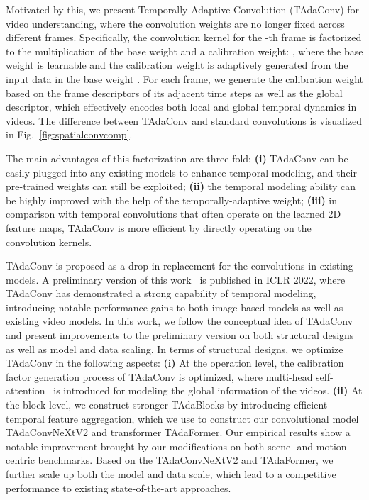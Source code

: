 \documentclass[10pt,journal,compsoc]{IEEEtran}
\begin{document}
Motivated by this, 
we present Temporally-Adaptive Convolution (TAdaConv) for video understanding, where the convolution weights are no longer fixed across different frames. 
Specifically, the convolution kernel for the -th frame  is factorized to the multiplication of the base weight and a calibration weight: , where the base weight  is learnable and the calibration weight  is adaptively generated from the input data in the base weight . 
For each frame, we generate the calibration weight based on the frame descriptors of its adjacent time steps as well as the global descriptor, which effectively encodes both local and global temporal dynamics in videos. The difference between TAdaConv and standard convolutions is visualized in Fig.~\ref{fig:spatialconvcomp}.

The main advantages of this factorization are three-fold: \textbf{(i)} TAdaConv can be easily plugged into any existing models to enhance temporal modeling, and their pre-trained weights can still be exploited; \textbf{(ii)} the temporal modeling ability can be highly improved with the help of the temporally-adaptive weight; \textbf{(iii)} in comparison with temporal convolutions that often operate on the learned 2D feature maps, TAdaConv is more efficient by directly operating on the convolution kernels.

TAdaConv is proposed as a drop-in replacement for the convolutions in existing models. 
A preliminary version of this work~\cite{huangtada} is published in ICLR 2022, where TAdaConv has demonstrated a strong capability of temporal modeling, introducing notable performance gains to both image-based models as well as existing video models. 
In this work, we follow the conceptual idea of TAdaConv and present improvements to the preliminary version on both structural designs as well as model and data scaling. In terms of structural designs, we optimize TAdaConv in the following aspects:
\textbf{(i)} At the operation level, the calibration factor generation process of TAdaConv is optimized, where multi-head self-attention~\cite{vaswani2017attention} is introduced for modeling the global information of the videos. 
\textbf{(ii)} At the block level, we construct stronger TAdaBlocks by introducing efficient temporal feature aggregation, which we use to construct our convolutional model TAdaConvNeXtV2 and transformer TAdaFormer.
Our empirical results show a notable improvement brought by our modifications on both scene- and motion-centric benchmarks. 
Based on the TAdaConvNeXtV2 and TAdaFormer, we further scale up both the model and data scale, which lead to a competitive performance to existing state-of-the-art approaches. 
\end{document}
